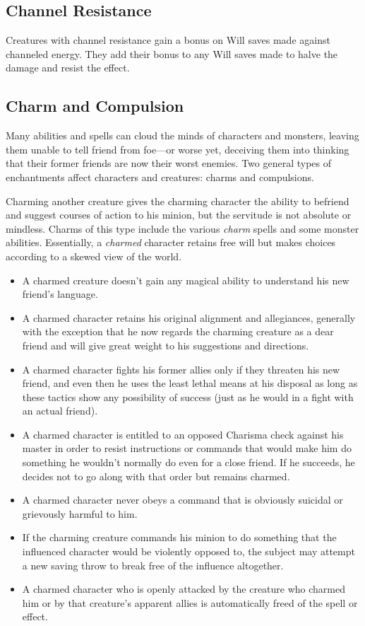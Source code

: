 \subsection{Channel Resistance}

				
Creatures with channel resistance gain a bonus on Will saves made against channeled energy. They add their bonus to any Will saves made to halve the damage and resist the effect.
				
\subsection{Charm and Compulsion}

				
Many abilities and spells can cloud the minds of characters and monsters, leaving them unable to tell friend from foe---or worse yet, deceiving them into thinking that their former friends are now their worst enemies. Two general types of enchantments affect characters and creatures: charms and compulsions.
				
Charming another creature gives the charming character the ability to befriend and suggest courses of action to his minion, but the servitude is not absolute or mindless. Charms of this type include the various \textit{charm }spells and some monster abilities. Essentially, a \textit{charmed }character retains free will but makes choices according to a skewed view of the world.
				\begin{itemize}\item  A charmed creature doesn't gain any magical ability to understand his new friend's language.
				\item  A charmed character retains his original alignment and allegiances, generally with the exception that he now regards the charming creature as a dear friend and will give great weight to his suggestions and directions.
				\item  A charmed character fights his former allies only if they threaten his new friend, and even then he uses the least lethal means at his disposal as long as these tactics show any possibility of success (just as he would in a fight with an actual friend).
				\item  A charmed character is entitled to an opposed Charisma check against his master in order to resist instructions or commands that would make him do something he wouldn't normally do even for a close friend. If he succeeds, he decides not to go along with that order but remains charmed\textit{.}
				\item  A charmed character never obeys a command that is obviously suicidal or grievously harmful to him.
				\item  If the charming creature commands his minion to do something that the influenced character would be violently opposed to, the subject may attempt a new saving throw to break free of the influence altogether.
				\item  A charmed character who is openly attacked by the creature who charmed him or by that creature's apparent allies is automatically freed of the spell or effect.
\end{itemize}
				
